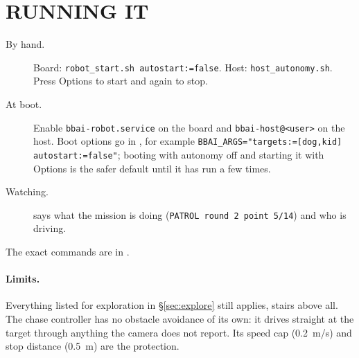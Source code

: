\section{RUNNING IT}

\begin{description}
\item[By hand.] Board:
  \texttt{robot\_start.sh autostart:=false}. Host:
  \texttt{host\_autonomy.sh}. Press Options to start and again to stop.
\item[At boot.] Enable \texttt{bbai-robot.service} on the board and
  \texttt{bbai-host@<user>} on the host. Boot options go in
  , for example
  \texttt{BBAI\_ARGS="targets:=[dog,kid] autostart:=false"}; booting with
  autonomy off and starting it with Options is the safer default until it has
  run a few times.
\item[Watching.]  says what the mission is doing
  (\texttt{PATROL round 2 point 5/14}) and  who is
  driving.
\end{description}
The exact commands are in .

\paragraph{Limits.} Everything listed for exploration in \S\ref{sec:explore}
still applies, stairs above all. The chase controller has no obstacle
avoidance of its own: it drives straight at the target through anything the
camera does not report. Its speed cap (\SI{0.2}{m/s}) and stop distance
(\SI{0.5}{m}) are the protection.
